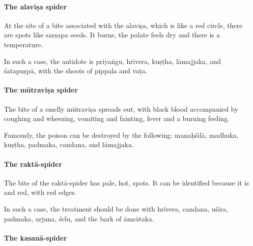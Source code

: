 \begin{translation}
\paragraph{The \Gls{alaviṣa} spider}

\item[109]

At the site of a bite associated with the \Gls{alaviṣa}, which is like a red circle, 
there are spots like \gls{sarṣapa} seeds.  It burns, the palate feels dry and 
there is a temperature.

\item [110]

In such a case, the antidote is
\gls{priyaṅgu},
\gls{hrīvera},
\gls{kuṣṭha},
\gls{lāmajjaka}, and
\gls{śatapuṣpā},
with the shoots of 
\gls{pippala}
and \gls{vaṭa}.


\paragraph{The \Gls{mūtraviṣa} spider}

\item[111]

The bite of a smelly \Gls{mūtraviṣa} spreads out, with black blood
accompanied by coughing and wheezing, vomiting and fainting, fever and
a burning feeling.

\item [112]

Famously, the poison can be destroyed by the following:
\gls{manaḥśilā},
\gls{madhuka},
\gls{kuṣṭha},
\gls{padmaka},
\gls{candana}, and
\gls{lāmajjaka}.


\paragraph{The \Gls{raktā-spider}}

\item[113]

The bite of the \Gls{raktā-spider} has pale, hot, 
spots.  It can be identified because it is  and red, with red edges.

\item[114]

In such a case, the treatment should be done with 
\gls{hrīvera},
\gls{candana},
\gls{uśīra},
\gls{padmaka},
\gls{arjuna},
\gls{śelu}, and the
bark of 
\gls{āmrātaka}.


\paragraph{The \Gls{kasanā-spider}}


\end{translation}
